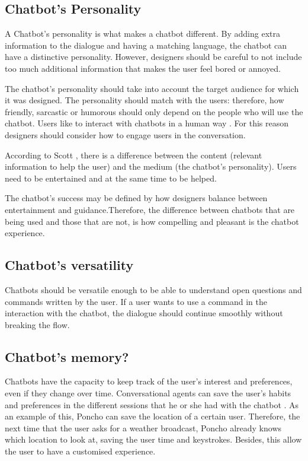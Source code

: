 \documentclass[a4paper,10pt]{article}
\begin{document}
\subsection*{Chatbot's Personality}

A Chatbot’s personality is what makes a chatbot different. By adding extra information to the dialogue and having a matching language, the chatbot can have a distinctive personality. However, designers should be careful to not include too much additional information that makes the user feel bored or annoyed. 

The chatbot’s personality should take into account the target audience for which it was designed. The personality should match with the users: therefore, how friendly, sarcastic or humorous should only depend on the people who will use the chatbot. Users like to interact with chatbots in a human way \cite{HeuristicsWebPage}. For this reason designers should consider how to engage users in the conversation. 

According to Scott \cite{HeuristicsWebPage}, there is a difference between the content (relevant information to help the user) and the medium (the chatbot’s personality). Users need to be entertained and at the same time to be helped.

The chatbot’s success may be defined by how designers balance between entertainment and guidance.Therefore, the difference between chatbots that are being used and those that are not, is how compelling and pleasant is the chatbot experience.   

\subsection*{Chatbot's versatility}

Chatbots should be versatile enough to be able to understand open questions and commands written by the user. If a user wants to use a command in the interaction with the chatbot, the dialogue should continue smoothly without breaking the flow.

\subsection*{Chatbot's memory?}

Chatbots have the capacity to keep track of the user's interest and preferences, even if they change over time. Conversational agents can save the user's habits and preferences in the different sessions that he or she had with the chatbot \cite{shneiderman1997direct}. As an example of this, Poncho can save the location of a certain user. Therefore, the next time that the user asks for a weather broadcast, Poncho already knows which location to look at, \cite{poncho2017} saving the user time and keystrokes. Besides, this allow the user to have a customised experience. 
\end{document}
